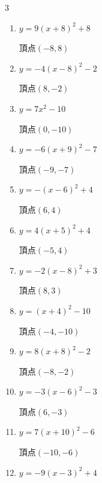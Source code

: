 \begin{multicols}{3}
\begin{enumerate}
        $\displaystyle 頂点\left( 9 , -6 \right)$

\columnbreak %

  \item $\displaystyle y=9\left( x+8\right)^{2}+8$

        $\displaystyle 頂点\left( -8 , 8 \right)$

  \item $\displaystyle y=-4\left( x-8\right)^{2}-2$

        $\displaystyle 頂点\left( 8 , -2 \right)$

  \item $\displaystyle y=7x^{2}-10$

        $\displaystyle 頂点\left( 0 , -10 \right)$

  \item $\displaystyle y=-6\left( x+9\right)^{2}-7$

        $\displaystyle 頂点\left( -9 , -7 \right)$

  \item $\displaystyle y=-\left( x-6\right)^{2}+4$

        $\displaystyle 頂点\left( 6 , 4 \right)$

  \item $\displaystyle y=4\left( x+5\right)^{2}+4$

        $\displaystyle 頂点\left( -5 , 4 \right)$

  \item $\displaystyle y=-2\left( x-8\right)^{2}+3$

        $\displaystyle 頂点\left( 8 , 3 \right)$

  \item $\displaystyle y=\left( x+4\right)^{2}-10$

        $\displaystyle 頂点\left( -4 , -10 \right)$

  \item $\displaystyle y=8\left( x+8\right)^{2}-2$

        $\displaystyle 頂点\left( -8 , -2 \right)$

  \item $\displaystyle y=-3\left( x-6\right)^{2}-3$

        $\displaystyle 頂点\left( 6 , -3 \right)$

  \item $\displaystyle y=7\left( x+10\right)^{2}-6$

        $\displaystyle 頂点\left( -10 , -6 \right)$

  \item $\displaystyle y=-9\left( x-3\right)^{2}+4$


\end{enumerate}
\end{multicols}
